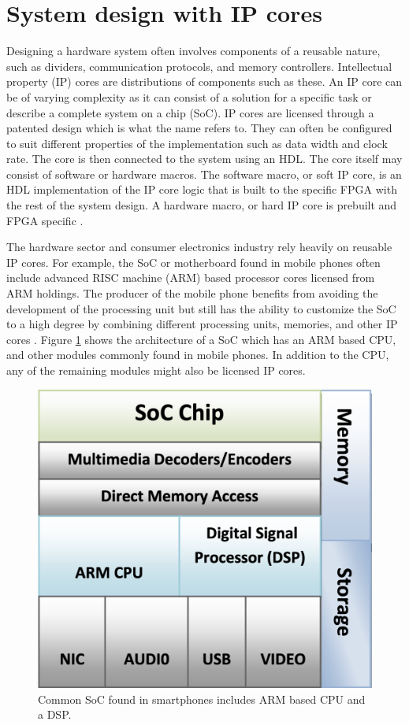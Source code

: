 \documentclass[12pt]{report}
\begin{document}
\section{System design with IP cores}
Designing a hardware system often involves components of a reusable nature, such as dividers, communication protocols, and memory controllers. Intellectual property (IP) cores are distributions of components such as these. An IP core can be of varying complexity as it can consist of a solution for a specific task or describe a complete system on a chip (SoC). IP cores are licensed through a patented design which is what the name refers to. They can often be configured to suit different properties of the implementation such as data width and clock rate. The core is then connected to the system using an HDL. The core itself may consist of software or hardware macros. The software macro, or soft IP core, is an HDL implementation of the IP core logic that is built to the specific FPGA with the rest of the system design. A hardware macro, or hard IP core is prebuilt and FPGA specific \citep{EERefBook} \citep{XilVivado}.
\par
The hardware sector and consumer electronics industry rely heavily on reusable IP cores. For example, the SoC or motherboard found in mobile phones often include advanced RISC machine (ARM) based processor cores licensed from ARM holdings. The producer of the mobile phone benefits from avoiding the development of the processing unit but still has the ability to customize the SoC to a high degree by combining different processing units, memories, and other IP cores \citep{ArmInMobile} \citep{HarvIPCore}. Figure \ref{fig:6} shows the architecture of a SoC which has an ARM based CPU, and other modules commonly found in mobile phones. In addition to the CPU, any of the remaining modules might also be licensed IP cores.

\begin{figure}[h]
    \centering
    \includegraphics[scale=0.25]{figures/arm_soc.png}
    \caption{Common SoC found in smartphones includes ARM based CPU and a DSP. \citep{ArmInMobile}}
    \label{fig:6}
\end{figure}
\end{document}
